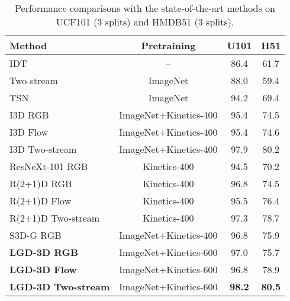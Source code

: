 \documentclass[10pt,twocolumn,letterpaper]{article}
\begin{document}
\begin{table}
\centering
\small
\caption{\small Performance comparisons with the state-of-the-art methods on UCF101 (3 splits) and HMDB51 (3 splits).}
\vspace{0.1cm}
\begin{tabular}{l@{~}c@{~}|@{~}c@{~}|@{~}c@{~~}} \hline
\begin{minipage}{1.5cm}\vspace{0.12cm} \textbf{Method} \vspace{0.12cm}\end{minipage} & \textbf{Pretraining} & \textbf{U101} & \textbf{H51} \\ \hline
IDT \cite{wang2013action} & -- & 86.4 & 61.7 \\
Two-stream \cite{simonyan2014two} & ImageNet & 88.0 & 59.4 \\
TSN \cite{wang2016temporal} & ImageNet & 94.2 & 69.4 \\ \hline
I3D RGB \cite{carreira2017quo} & ImageNet+Kinetics-400 & 95.4 & 74.5 \\
I3D Flow \cite{carreira2017quo} & ImageNet+Kinetics-400 & 95.4 & 74.6\\
I3D Two-stream \cite{carreira2017quo} & ImageNet+Kinetics-400 & 97.9 & 80.2 \\
ResNeXt-101 RGB \cite{hara2018can} & Kinetics-400 & 94.5 & 70.2 \\
R(2+1)D RGB \cite{tran2018closer} & Kinetics-400 & 96.8& 74.5\\
R(2+1)D Flow \cite{tran2018closer} & Kinetics-400 & 95.5& 76.4\\
R(2+1)D Two-stream \cite{tran2018closer} & Kinetics-400 & 97.3& 78.7\\
S3D-G RGB \cite{xie2018rethinking} & ImageNet+Kinetics-400 & 96.8 & 75.9\\ \hline
\textbf{LGD-3D RGB} & ImageNet+Kinetics-600 & 97.0 & 75.7 \\
\textbf{LGD-3D Flow} & ImageNet+Kinetics-600 & 96.8 & 78.9 \\
\textbf{LGD-3D Two-stream} & ImageNet+Kinetics-600 & \textbf{98.2} & \textbf{80.5} \\ \hline
\end{tabular}
\vspace{-0.05in}
\label{tab:u101h51}
\end{table}
\end{document}

